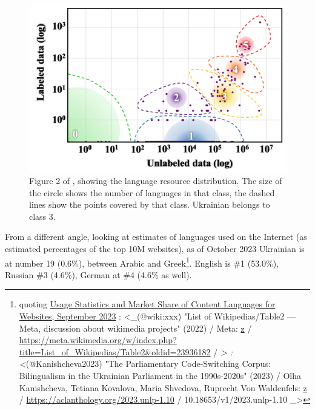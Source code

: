 \begin{figure}[t]
\centering
\includegraphics[width=1.0\linewidth]{Figures/Pasted image 20231030165827.png}
\decoRule
\caption[Language resource distribution]{Figure 2 of \cite{inclusion}, showing the language resource distribution. The size of the circle shows the number of languages in that class, the dashed lines show the points covered by that class. Ukrainian belongs to class 3.
}
\label{fig:bender}
\end{figure}

From a different angle, looking at estimates of languages used on the
Internet (as estimated percentages of the top 10M websites), as of
October 2023 Ukrainian is at number 19 (0.6\%), between Arabic and
Greek\cite{enwiki:1182341232}\footnote{quoting
  \href{https://w3techs.com/technologies/overview/content_language}{Usage
  Statistics and Market Share of Content Languages for Websites,
  September 2023} \cite{wiki:xxx}: \textless\_(@wiki:xxx) "List of
  Wikipedias/Table2 --- Meta, discussion about wikimedia projects"
  (2022) / Meta: \href{zotero://select/items/@wiki:xxx}{z} /
  \href{https://meta.wikimedia.org/w/index.php?title=List_of_Wikipedias/Table2&oldid=23936182}{\url{https://meta.wikimedia.org/w/index.php?title=List_of_Wikipedias/Table2&oldid=23936182}}
  / \emph{\textgreater{} \cite{Kanishcheva2023}:
  \textless{}}(@Kanishcheva2023) "The Parliamentary Code-Switching
  Corpus: Bilingualism in the Ukrainian Parliament in the 1990s-2020s"
  (2023) / Olha Kanishcheva, Tetiana Kovalova, Maria Shvedova, Ruprecht
  Von Waldenfels: \href{zotero://select/items/@Kanishcheva2023}{z} /
  \href{https://aclanthology.org/2023.unlp-1.10}{\url{https://aclanthology.org/2023.unlp-1.10}}
  / 10.18653/v1/2023.unlp-1.10 \_\textgreater{}}. English is \#1
(53.0\%), Russian \#3 (4.6\%), German at \#4 (4.6\% as well).

